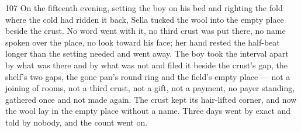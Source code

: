 \begin{CRchronicle}{107}
On the fifteenth evening, setting the boy on his bed and righting the fold where the cold had ridden it back, Sella tucked the wool into the empty place beside the crust. No word went with it, no third crust was put there, no name spoken over the place, no look toward his face; her hand rested the half-beat longer than the setting needed and went away. The boy took the interval apart by what was there and by what was not and filed it beside the crust’s gap, the shelf’s two gaps, the gone pan’s round ring and the field’s empty place — not a joining of rooms, not a third crust, not a gift, not a payment, no payer standing, gathered once and not made again. The crust kept its hair-lifted corner, and now the wool lay in the empty place without a name. Three days went by exact and told by nobody, and the count went on.
\end{CRchronicle}
